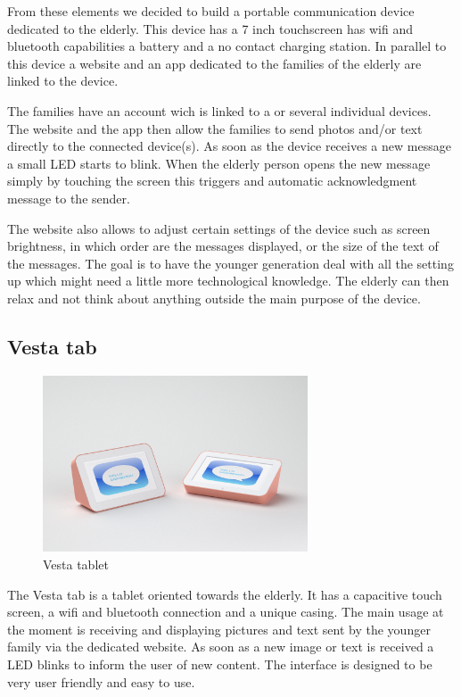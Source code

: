 From these elements we decided to build a portable communication device dedicated to the elderly. This device has a 7 inch touchscreen has wifi and bluetooth
capabilities a battery and a no contact charging station. In parallel to this device a website and an app dedicated to the families of the elderly are linked to the device.

The families have an account wich is linked to a or several individual devices. The website and the app then allow the families to send photos and/or text directly to the connected device(s).
As soon as the device receives a new message a small LED starts to blink. When the elderly person opens the new message simply by touching the screen this triggers and automatic acknowledgment message to the sender.

The website also allows to adjust certain settings of the device such as screen brightness, in which order are the messages displayed, or the size of the text of the messages. The goal is to have the younger generation deal with all the setting up which might need a little more technological knowledge. The elderly can then relax and not think about anything outside the main purpose of the device.

\clearpage

\subsection{Vesta tab}

\begin{figure}[!htb]
    \centering
    \includegraphics[width=0.7\textwidth,keepaspectratio]{chap/designFig/VisioRender5.png}
    \caption{Vesta tablet}
    \label{fig:vesta tablet}
\end{figure}

The Vesta tab is a tablet oriented towards the elderly. It has a capacitive touch screen, a wifi and bluetooth connection and a unique casing. The main usage at the moment is receiving and displaying pictures and text sent by the younger family via the dedicated website. As soon as a new image or text is received a LED blinks to inform the user of new content. The interface is designed to be very user friendly and easy to use.
